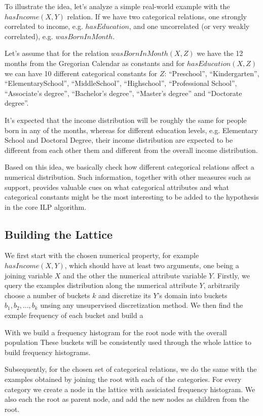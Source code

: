 To illustrate the idea, let's analyze a simple real-world example with the $hasIncome(X,Y)$ relation. If we have two
categorical relations, one strongly correlated to income, e.g. $hasEducation$, and one uncorrelated (or very weakly
correlated), e.g. $wasBornInMonth$.

Let's assume that for the relation $wasBornInMonth(X,Z)$ we have the 12 months from the Gregorian Calendar as
constants and for $hasEducation(X,Z)$ we can have 10 different categorical constants for $Z$: ``Preschool'',
``Kindergarten'', ``ElementarySchool'', ``MiddleSchool'', ``Highschool'', ``Professional School'', ``Associate's
degree'', ``Bachelor's degree'', ``Master's degree'' and ``Doctorate degree''. 

It's expected that the income distribution will be roughly the same for people born in any of the months, whereas
for different education levels, e.g. Elementary School and Doctoral Degree, their income distribution are expected to be
different from each other them and different from the overall income distribution.

Based on this idea, we basically check how different categorical relations affect a numerical distribution. Such
information, together with other measures such as support, provides valuable cues on what categorical attributes and
what
categorical constants might be the most interesting to be added to the hypothesis in the core ILP algorithm.

\subsection{Building the Lattice}

We first start with the chosen numerical property, for example $hasIncome(X,Y)$, which should have at least two
arguments, one being a joining variable $X$ and the other the numerical attribute variable $Y$. Firstly, we query the
examples distribution along the numerical attribute $Y$, arbitrarily choose a number of buckets $k$ and discretize
its $Y$'s domain into buckets $b_1, b_2, \dots, b_k$ unsing any unsupervised discretization method. We then find the
exmple frequency of each bucket and build a

With we build a frequency histogram for the root node with the overall population 
These buckets will be consistently used through the whole lattice to build frequency histograms.



Subsequently, for the chosen set of categorical relations, we do the same with the examples obtained by joining the root
with each of the categories. For every category we create a node in the lattice with assiciated frequency histogram. We
also each the root as parent node, and add the new nodes as children from the root.

